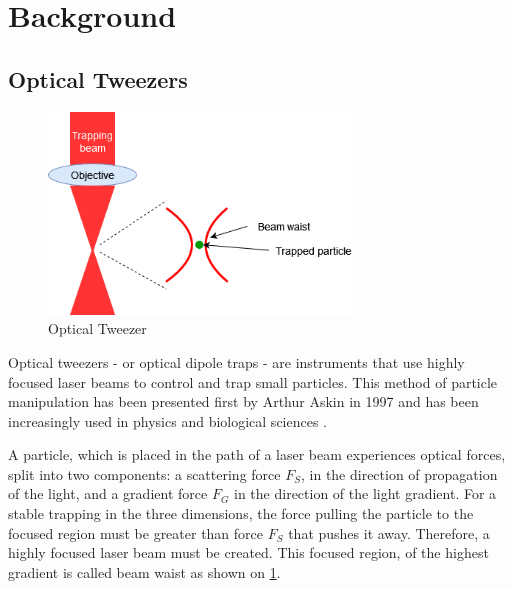 \documentclass{epsrc}
\begin{document}
\vspace{16pt}

\section{Background} \label{Background}

\vspace{4pt}

\subsection{Optical Tweezers}

\begin{figure}
\vspace{-11pt}
	\begin{center}
		\includegraphics[width=8.2cm]{img/Tweezer.png}
			\vspace{-30pt}
		\caption{Optical Tweezer}
		\label{fig:tweez}
	\end{center}
\end{figure}

Optical tweezers - or optical dipole traps - are instruments that use highly focused laser beams to control and trap small particles. This method of particle manipulation has been presented first by Arthur Askin in 1997  and has been increasingly used in physics and biological sciences \citeA{}.

A particle, which is placed in the path of a laser beam experiences optical forces, split into two components: a scattering force $F_S$, in the direction of propagation of the light, and a gradient force $F_G$ in the direction of the light gradient. For a stable trapping in the three dimensions, the force pulling the particle to the focused region must be greater than force $F_S$ that pushes it away. Therefore, a highly focused laser beam must be created. This focused region, of the highest gradient is called beam waist as shown on \ref{fig:tweez}.
\end{document}
